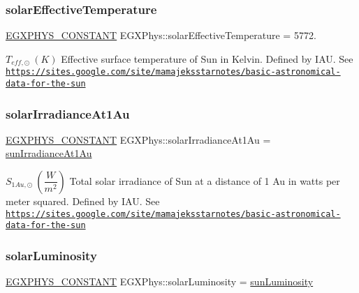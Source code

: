 \subsubsection{\texorpdfstring{solar\+Effective\+Temperature}{solarEffectiveTemperature}}
{\footnotesize\ttfamily \mbox{\hyperlink{group___e_g_x_phys-_constants-_macros_ga76980d288494ce1714c9ac68a95ba702}{E\+G\+X\+P\+H\+Y\+S\+\_\+\+C\+O\+N\+S\+T\+A\+NT}} E\+G\+X\+Phys\+::solar\+Effective\+Temperature = 5772.}

$ T_{eff,\odot} \ (K)$ Effective surface temperature of Sun in Kelvin. Defined by I\+AU. See \href{https://sites.google.com/site/mamajeksstarnotes/basic-astronomical-data-for-the-sun}{\tt https\+://sites.\+google.\+com/site/mamajeksstarnotes/basic-\/astronomical-\/data-\/for-\/the-\/sun} \mbox{\label{group___e_g_x_phys-_constants-_astrophysics-_solar_system-_sun-_bulk_ga4ed5c970359ffccba0d45fc95541b332}} 
\subsubsection{\texorpdfstring{solar\+Irradiance\+At1\+Au}{solarIrradianceAt1Au}}
{\footnotesize\ttfamily \mbox{\hyperlink{group___e_g_x_phys-_constants-_macros_ga76980d288494ce1714c9ac68a95ba702}{E\+G\+X\+P\+H\+Y\+S\+\_\+\+C\+O\+N\+S\+T\+A\+NT}} E\+G\+X\+Phys\+::solar\+Irradiance\+At1\+Au = \mbox{\hyperlink{group___e_g_x_phys-_constants-_astrophysics-_solar_system-_sun-_bulk_ga7632e3eda212f81ae257daab783a1a3f}{sun\+Irradiance\+At1\+Au}}}

$ S_{1Au,\odot} \ (\dfrac{W}{m^2})$ Total solar irradiance of Sun at a distance of 1 Au in watts per meter squared. Defined by I\+AU. See \href{https://sites.google.com/site/mamajeksstarnotes/basic-astronomical-data-for-the-sun}{\tt https\+://sites.\+google.\+com/site/mamajeksstarnotes/basic-\/astronomical-\/data-\/for-\/the-\/sun} \mbox{\label{group___e_g_x_phys-_constants-_astrophysics-_solar_system-_sun-_bulk_ga1fa4f167b9b8f594d35d879fdfdde7b4}} 
\subsubsection{\texorpdfstring{solar\+Luminosity}{solarLuminosity}}
{\footnotesize\ttfamily \mbox{\hyperlink{group___e_g_x_phys-_constants-_macros_ga76980d288494ce1714c9ac68a95ba702}{E\+G\+X\+P\+H\+Y\+S\+\_\+\+C\+O\+N\+S\+T\+A\+NT}} E\+G\+X\+Phys\+::solar\+Luminosity = \mbox{\hyperlink{group___e_g_x_phys-_constants-_astrophysics-_solar_system-_sun-_bulk_gaac188526cc9b051a26372e1a3b5b66b7}{sun\+Luminosity}}}


